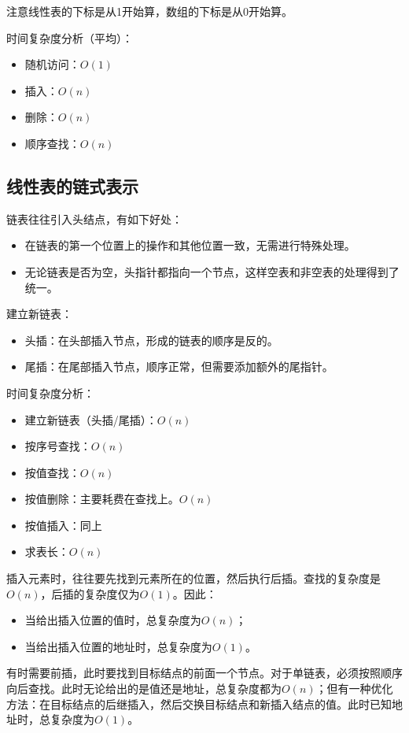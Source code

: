 \documentclass[12pt, a4paper, oneside]{ctexart}
\begin{document}
注意线性表的下标是从1开始算，数组的下标是从0开始算。

时间复杂度分析（平均）：
\begin{itemize}
  \item 随机访问：$O(1)$
  \item 插入：$O(n)$
  \item 删除：$O(n)$
  \item 顺序查找：$O(n)$
\end{itemize}

\subsection{线性表的链式表示}

链表往往引入头结点，有如下好处：
\begin{itemize}
  \item 在链表的第一个位置上的操作和其他位置一致，无需进行特殊处理。
  \item 无论链表是否为空，头指针都指向一个节点，这样空表和非空表的处理得到了统一。
\end{itemize}

建立新链表：
\begin{itemize}
  \item 头插：在头部插入节点，形成的链表的顺序是反的。
  \item 尾插：在尾部插入节点，顺序正常，但需要添加额外的尾指针。
\end{itemize}

时间复杂度分析：
\begin{itemize}
  \item 建立新链表（头插/尾插）：$O(n)$
  \item 按序号查找：$O(n)$
  \item 按值查找：$O(n)$
  \item 按值删除：主要耗费在查找上。$O(n)$
  \item 按值插入：同上
  \item 求表长：$O(n)$
\end{itemize}

插入元素时，往往要先找到元素所在的位置，然后执行后插。查找的复杂度是$O(n)$，后插的复杂度仅为$O(1)$。因此：
\begin{itemize}
  \item 当给出插入位置的值时，总复杂度为$O(n)$；
  \item 当给出插入位置的地址时，总复杂度为$O(1)$。
\end{itemize}

有时需要前插，此时要找到目标结点的前面一个节点。对于单链表，必须按照顺序向后查找。此时无论给出的是值还是地址，总复杂度都为$O(n)$；但有一种优化方法：在目标结点的后继插入，然后交换目标结点和新插入结点的值。此时已知地址时，总复杂度为$O(1)$。
\end{document}
